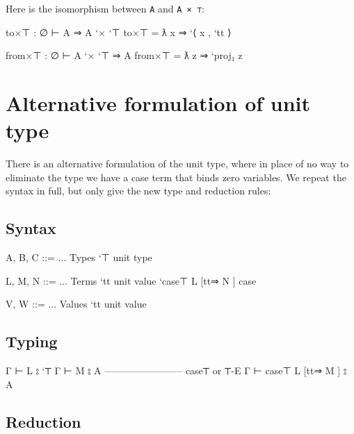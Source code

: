 Here is the isomorphism between \texttt{A} and
\texttt{A\ \textasciigrave{}×\ \textasciigrave{}⊤}:

\begin{myDisplay}
to×⊤ : ∅ ⊢ A ⇒ A `× `⊤
to×⊤ = ƛ x ⇒ `⟨ x , `tt ⟩

from×⊤ : ∅ ⊢ A `× `⊤ ⇒ A
from×⊤ = ƛ z ⇒ `proj₁ z
\end{myDisplay}

\hypertarget{alternative-formulation-of-unit-type}{%
\section{Alternative formulation of unit
type}\label{alternative-formulation-of-unit-type}}

There is an alternative formulation of the unit type, where in place of
no way to eliminate the type we have a case term that binds zero
variables. We repeat the syntax in full, but only give the new type and
reduction rules:

\hypertarget{syntax-6}{%
\subsection{Syntax}\label{syntax-6}}

\begin{myDisplay}
A, B, C ::= ...                     Types
  `⊤                                  unit type

L, M, N ::= ...                     Terms
  `tt                                 unit value
  `case⊤ L [tt⇒ N ]                   case

V, W ::= ...                        Values
  `tt                                 unit value
\end{myDisplay}

\hypertarget{typing-6}{%
\subsection{Typing}\label{typing-6}}

\begin{myDisplay}
Γ ⊢ L ⦂ `⊤
Γ ⊢ M ⦂ A
------------------------ case⊤ or ⊤-E
Γ ⊢ case⊤ L [tt⇒ M ] ⦂ A
\end{myDisplay}

\hypertarget{reduction-6}{%
\subsection{Reduction}\label{reduction-6}}

